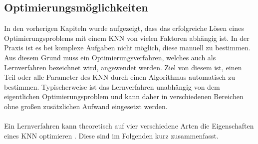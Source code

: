 \subsection{Optimierungsmöglichkeiten}
\label{subsec:optimization_strategies}
In den vorherigen Kapiteln wurde aufgezeigt, dass das erfolgreiche Lösen eines Optimierungsproblems mit einem \ac{KNN} von vielen Faktoren abhängig ist. In der Praxis ist es bei komplexe Aufgaben nicht möglich, diese manuell zu bestimmen. Aus diesem Grund muss ein Optimierungsverfahren, welches auch als Lernverfahren bezeichnet wird, angewendet werden. Ziel von diesem ist, einen Teil oder alle Parameter des \ac{KNN} durch einen Algorithmus automatisch zu bestimmen. Typischerweise ist das Lernverfahren unabhängig von dem eigentlichen Optimierungsproblem und kann daher in verschiedenen Bereichen ohne großen zusätzlichen Aufwand eingesetzt werden.\\\\
Ein Lernverfahren kann theoretisch auf vier verschiedene Arten die Eigenschaften eines \ac{KNN} optimieren \cite{zell2003simulation}. Diese sind im Folgenden kurz zusammenfasst.

